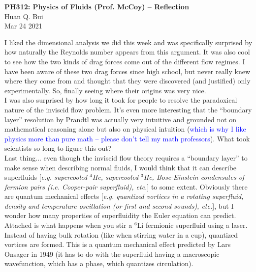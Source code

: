 \documentclass[11pt]{article}
\begin{document}
\begin{center}
{\large \bf PH312: Physics of Fluids (Prof. McCoy) -- Reflection}\\
{ Huan Q. Bui}\\
Mar 24 2021
\end{center}


I liked the dimensional analysis we did this week and was specifically surprised by how naturally the Reynolds number appears from this argument.  It was also cool to see how the two kinds of drag forces come out of the different flow regimes. I have been aware of these two drag forces since high school, but never really knew where they come from and thought that they were discovered (and justified) only experimentally. So, finally seeing where their origins was very nice. \\




I was also surprised by how long it took for people to resolve the paradoxical nature of the inviscid flow problem. It's even more interesting that the ``boundary layer'' resolution by Prandtl was actually very intuitive and grounded not on mathematical reasoning alone but also on physical intuition (\textcolor{blue}{which is why I like physics more than pure math -- please don't tell my math professors}). What took scientists so long to figure this out?\\


Last thing... even though the inviscid flow theory requires a ``boundary layer'' to make sense when describing normal fluids, I would think that it can describe superfluids [\textit{e.g. supercooled $^4$He, supercooled $^3$He, Bose-Einstein condensates of fermion pairs (i.e. Cooper-pair superfluid), etc.}] to some extent. Obviously there are quantum mechanical effects [\textit{e.g. quantized vortices in a rotating superfluid, density and temperature oscillation (or \textit{first} and \textit{second} sounds), etc.}], but I wonder how many properties of superfluidity the Euler equation can predict. \\


Attached is what happens when you stir a $^6$Li fermionic superfluid using a laser. Instead of having bulk rotation (like when stirring water in a cup), quantized vortices are formed. This is a quantum mechanical effect predicted by Lars Onsager in 1949 (it has to do with the superfluid having a macroscopic wavefunction, which has a phase, which quantizes circulation).
\end{document}
